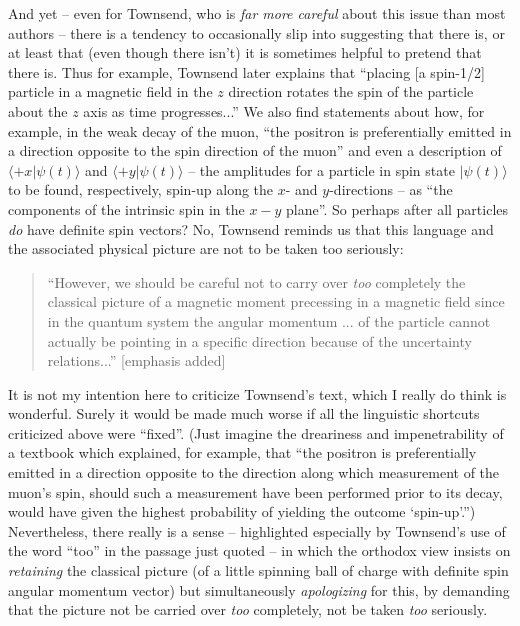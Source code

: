 \documentclass[aps,prc,onecolumn,letterpaper,floatfix,12pt]{revtex4}
\begin{document}
And yet -- even for Townsend, who is \emph{far more careful} about
this issue than most authors \cite{griffiths} -- there is a tendency
to occasionally slip into suggesting that there is, or at least that
(even though there isn't) it is sometimes helpful to pretend that
there is.  Thus for
example, Townsend later explains that  ``placing [a spin-1/2] particle in a
magnetic field in the $z$ direction rotates the spin of the particle
about the $z$ axis as time progresses...''   We also find statements
about how, for example, in the weak decay of the muon, ``the positron
is preferentially emitted in a direction opposite to the spin
direction of the muon'' and even a description of $\langle +x | \psi(t)
\rangle$ and $\langle +y | \psi(t) \rangle$  -- the amplitudes for a
particle in spin state $| \psi(t)\rangle$ to be found, respectively,
spin-up along the $x$- and $y$-directions -- as ``the components of the
intrinsic spin in the $x-y$ plane''.  So perhaps after all particles
\emph{do} have definite spin vectors?  No, Townsend
reminds us that this language and the associated physical picture are not
to be taken too seriously:  
\begin{quote}
``However, we should be careful not to carry over \emph{too} completely the
classical picture of a magnetic moment precessing in a magnetic field
since in the quantum system the angular momentum ... of the particle
cannot actually be pointing in a specific direction because of the
uncertainty relations...''  [emphasis added]
\end{quote}
It is not my intention here to criticize Townsend's text, which I
really do think is wonderful.  Surely it would be made much worse if
all the linguistic shortcuts criticized above were ``fixed''.
(Just imagine the dreariness and impenetrability of a
textbook which explained, for example, that ``the positron is
preferentially emitted in a direction opposite to the direction along
which measurement of the muon's spin, should such a measurement have
been performed prior to its decay, would have given the highest
probability of yielding the outcome `spin-up'.'')  Nevertheless, there
really is a sense -- highlighted especially by Townsend's use of the
word ``too'' in the passage just quoted -- in which the orthodox view
insists on \emph{retaining} the classical picture (of a little
spinning ball of charge with definite spin angular momentum vector)
but simultaneously \emph{apologizing} for this, by demanding that the
picture not be carried over \emph{too} completely, not be taken
\emph{too} seriously.  
\end{document}

